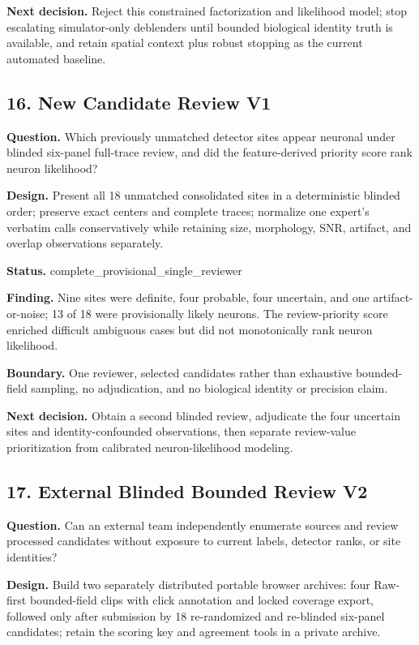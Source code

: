 \textbf{Next decision.} Reject this constrained factorization and likelihood model; stop escalating simulator-only deblenders until bounded biological identity truth is available, and retain spatial context plus robust stopping as the current automated baseline.

\subsection{16. New Candidate Review V1}

\textbf{Question.} Which previously unmatched detector sites appear neuronal under blinded six-panel full-trace review, and did the feature-derived priority score rank neuron likelihood?

\textbf{Design.} Present all 18 unmatched consolidated sites in a deterministic blinded order; preserve exact centers and complete traces; normalize one expert's verbatim calls conservatively while retaining size, morphology, SNR, artifact, and overlap observations separately.

\textbf{Status.} complete\_provisional\_single\_reviewer

\textbf{Finding.} Nine sites were definite, four probable, four uncertain, and one artifact-or-noise; 13 of 18 were provisionally likely neurons. The review-priority score enriched difficult ambiguous cases but did not monotonically rank neuron likelihood.

\textbf{Boundary.} One reviewer, selected candidates rather than exhaustive bounded-field sampling, no adjudication, and no biological identity or precision claim.

\textbf{Next decision.} Obtain a second blinded review, adjudicate the four uncertain sites and identity-confounded observations, then separate review-value prioritization from calibrated neuron-likelihood modeling.

\subsection{17. External Blinded Bounded Review V2}

\textbf{Question.} Can an external team independently enumerate sources and review processed candidates without exposure to current labels, detector ranks, or site identities?

\textbf{Design.} Build two separately distributed portable browser archives: four Raw-first bounded-field clips with click annotation and locked coverage export, followed only after submission by 18 re-randomized and re-blinded six-panel candidates; retain the scoring key and agreement tools in a private archive.


